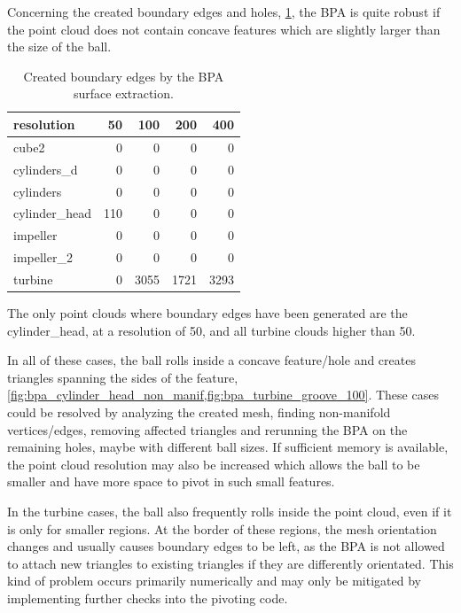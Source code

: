 Concerning the created boundary edges and holes, \cf \cref{tbl:bpa_boundary edges}, the BPA is quite robust if the point cloud does not contain concave features which are slightly larger than the size of the ball.
%
\begin{table}
	\centering
	\begin{tabular}{l|r|r|r|r}
		resolution     &  50 &  100 &  200 &  400 \\
		\midrule
		cube2          &   0 &    0 &    0 &    0 \\
		cylinders\_d   &   0 &    0 &    0 &    0 \\
		cylinders      &   0 &    0 &    0 &    0 \\
		cylinder\_head & 110 &    0 &    0 &    0 \\
		impeller       &   0 &    0 &    0 &    0 \\
		impeller\_2    &   0 &    0 &    0 &    0 \\
		turbine        &   0 & 3055 & 1721 & 3293 \\
	\end{tabular}
	\caption{
		Created boundary edges by the BPA surface extraction.
	}
	\label{tbl:bpa_boundary edges}
\end{table}
%
The only point clouds where boundary edges have been generated are the cylinder\_head, at a resolution of 50, and all turbine clouds higher than 50.

In all of these cases, the ball rolls inside a concave feature/hole and creates triangles spanning the sides of the feature, \cf \cref{fig:bpa_cylinder_head_non_manif,fig:bpa_turbine_groove_100}.
These cases could be resolved by analyzing the created mesh, finding non-manifold vertices/edges, removing affected triangles and rerunning the BPA on the remaining holes, maybe with different ball sizes.
If sufficient memory is available, the point cloud resolution may also be increased which allows the ball to be smaller and have more space to pivot in such small features.

In the turbine cases, the ball also frequently rolls inside the point cloud, even if it is only for smaller regions.
At the border of these regions, the mesh orientation changes and usually causes boundary edges to be left, as the BPA is not allowed to attach new triangles to existing triangles if they are differently orientated.
This kind of problem occurs primarily numerically and may only be mitigated by implementing further checks into the pivoting code.



